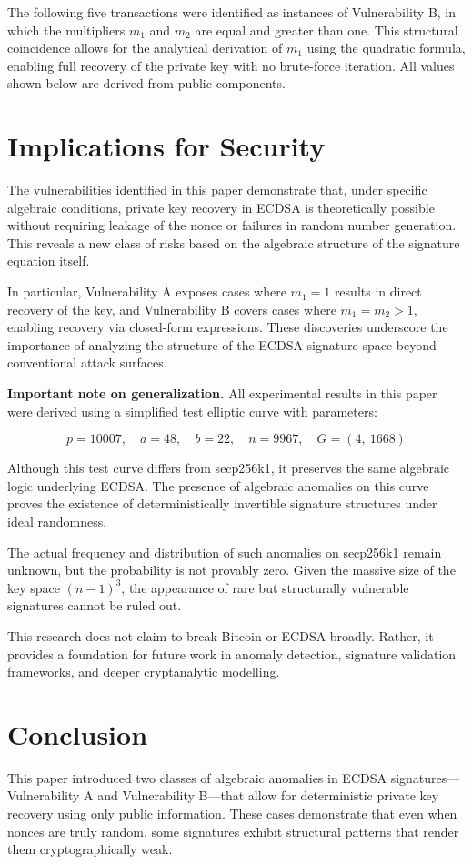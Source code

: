 \documentclass[11pt]{article}
\begin{document}
The following five transactions were identified as instances of Vulnerability B, in which the multipliers $m_1$ and $m_2$ are equal and greater than one. 
This structural coincidence allows for the analytical derivation of $m_1$ using the quadratic formula, enabling full recovery of the private key with no brute-force iteration.
All values shown below are derived from public components.

\section{Implications for Security}
The vulnerabilities identified in this paper demonstrate that, under specific algebraic conditions, private key recovery in ECDSA is theoretically possible without requiring leakage of the nonce or failures in random number generation. This reveals a new class of risks based on the algebraic structure of the signature equation itself.

In particular, Vulnerability A exposes cases where $m_1 = 1$ results in direct recovery of the key, and Vulnerability B covers cases where $m_1 = m_2 > 1$, enabling recovery via closed-form expressions. These discoveries underscore the importance of analyzing the structure of the ECDSA signature space beyond conventional attack surfaces.

\textbf{Important note on generalization.}  
All experimental results in this paper were derived using a simplified test elliptic curve with parameters:

\[
p = 10007,\quad a = 48,\quad b = 22,\quad n = 9967,\quad G = (4,\ 1668)
\]

Although this test curve differs from secp256k1, it preserves the same algebraic logic underlying ECDSA. The presence of algebraic anomalies on this curve proves the existence of deterministically invertible signature structures under ideal randomness.

The actual frequency and distribution of such anomalies on secp256k1 remain unknown, but the probability is not provably zero. Given the massive size of the key space $(n - 1)^3$, the appearance of rare but structurally vulnerable signatures cannot be ruled out.

This research does not claim to break Bitcoin or ECDSA broadly. Rather, it provides a foundation for future work in anomaly detection, signature validation frameworks, and deeper cryptanalytic modelling.

\section{Conclusion}
This paper introduced two classes of algebraic anomalies in ECDSA signatures—Vulnerability A and Vulnerability B—that allow for deterministic private key recovery using only public information. These cases demonstrate that even when nonces are truly random, some signatures exhibit structural patterns that render them cryptographically weak.
\end{document}
